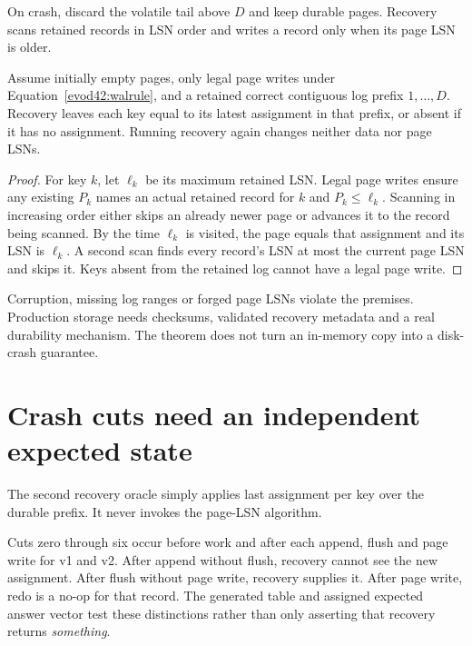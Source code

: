 
On crash, discard the volatile tail above $D$ and keep durable pages.
Recovery scans retained records in LSN order and writes a record only when
its page LSN is older.

\begin{proposition}
Assume initially empty pages, only legal page writes under
Equation~\ref{evod42:walrule}, and a retained correct contiguous log prefix
$1,\ldots,D$. Recovery leaves each key equal to its latest assignment in that
prefix, or absent if it has no assignment. Running recovery again changes
neither data nor page LSNs.
\end{proposition}
\begin{proof}
For key $k$, let $\ell_k$ be its maximum retained LSN. Legal page writes
ensure any existing $P_k$ names an actual retained record for $k$ and
$P_k\le\ell_k$. Scanning in increasing order either skips an already newer
page or advances it to the record being scanned. By the time $\ell_k$ is
visited, the page equals that assignment and its LSN is $\ell_k$. A second
scan finds every record's LSN at most the current page LSN and skips it.
Keys absent from the retained log cannot have a legal page write.
\end{proof}
Corruption, missing log ranges or forged page LSNs violate the premises.
Production storage needs checksums, validated recovery metadata and a real
durability mechanism. The theorem does not turn an in-memory copy into a
disk-crash guarantee.

\section{Crash cuts need an independent expected state}
\label{evod42:controls}
The second recovery oracle simply applies last assignment per key over the
durable prefix. It never invokes the page-LSN algorithm.

\begin{center}\end{center}
Cuts zero through six occur before work and after each append, flush and page
write for v1 and v2. After append without flush, recovery cannot see the new
assignment. After flush without page write, recovery supplies it. After page
write, redo is a no-op for that record. The generated table and assigned
expected answer vector test these distinctions rather than only asserting
that recovery returns \emph{something}.

